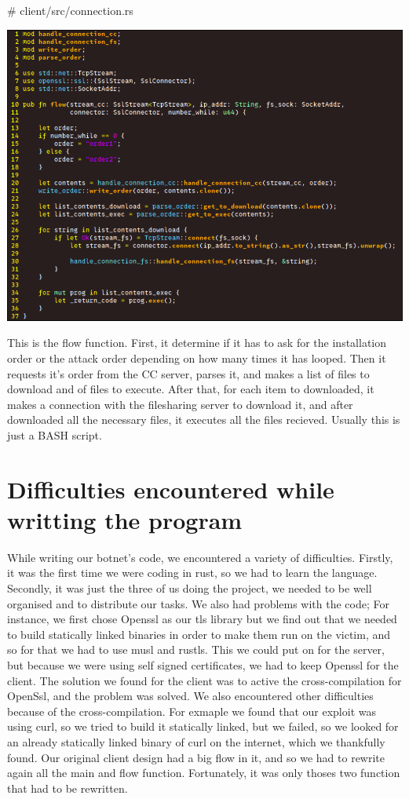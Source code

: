 \documentclass[../main.tex]{subfiles}
\begin{document}
    \# client/src/connection.rs

    \includegraphics[width=450pt]{client_flow.png}

    This is the flow function.
    First, it determine if it has to ask for the installation order or the attack order depending on how many times it has looped.
    Then it requests it's order from the CC server, parses it, and makes a list of files to download and of files to execute.
    After that, for each item to downloaded, it makes a connection with the filesharing server to download it, and after downloaded all the necessary files, it executes all the files recieved.
    Usually this is just a BASH script.


	\vspace{10pt}

	\section{Difficulties encountered while writting the program}

    While writing our botnet's code, we encountered a variety of difficulties.
    Firstly, it was the first time we were coding in rust, so we had to learn the language.
    Secondly, it was just the three of us doing the project, we needed to be well organised and to distribute our tasks.
    We also had problems with the code;
    For instance, we first chose Openssl as our tls library but we find out that we needed to build statically linked binaries in order to make them run on the victim, and so for that we had to use musl and rustls.
    This we could put on for the server, but because we were using self signed certificates, we had to keep Openssl for the client.
    The solution we found for the client was to active the cross-compilation for OpenSsl, and the problem was solved.
    We also encountered other difficulties because of the cross-compilation.
    For exmaple we found that our exploit was using curl, so we tried to build it statically linked, but we failed, so we looked for an already statically linked binary of curl on the internet, which we thankfully found.
    Our original client design had a big flow in it, and so we had to rewrite again all the main and flow function.
    Fortunately, it was only thoses two function that had to be rewritten.
\end{document}
